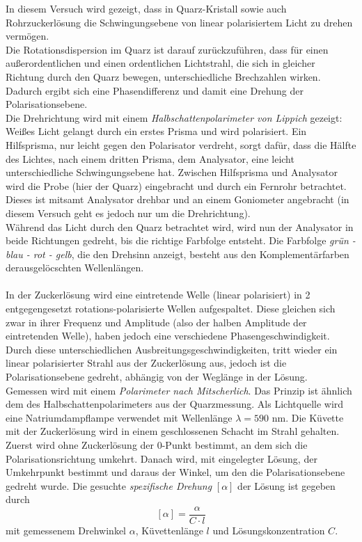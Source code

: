 \documentclass[12pt,a4paper]{article}
\begin{document}
\begin{multicols}{2}
In diesem Versuch wird gezeigt, dass in Quarz-Kristall sowie auch Rohrzuckerlösung die Schwingungsebene von linear polarisiertem Licht zu drehen vermögen.\\
Die Rotationsdispersion im Quarz ist darauf zurückzuführen, dass für einen außerordentlichen und einen ordentlichen Lichtstrahl, die sich in gleicher Richtung durch den Quarz bewegen, unterschiedliche Brechzahlen wirken. Dadurch ergibt sich eine Phasendifferenz und damit eine Drehung der Polarisationsebene.\\
Die Drehrichtung wird mit einem \emph{Halbschattenpolarimeter von Lippich} gezeigt: Weißes Licht gelangt durch ein erstes Prisma und wird polarisiert. Ein Hilfsprisma, nur leicht gegen den Polarisator verdreht, sorgt dafür, dass die Hälfte des Lichtes, nach einem dritten Prisma, dem Analysator, eine leicht unterschiedliche Schwingungsebene hat. Zwischen Hilfsprisma und Analysator wird die Probe (hier der Quarz) eingebracht und durch ein Fernrohr betrachtet. Dieses ist mitsamt Analysator drehbar und an einem Goniometer angebracht (in diesem Versuch geht es jedoch nur um die Drehrichtung).\\
Während das Licht durch den Quarz betrachtet wird, wird nun der Analysator in beide Richtungen gedreht, bis die richtige Farbfolge entsteht. Die Farbfolge \emph{grün - blau - rot - gelb}, die den Drehsinn anzeigt, besteht aus den Komplementärfarben derausgelöcschten Wellenlängen.\\
\\


In der Zuckerlösung wird eine eintretende Welle (linear polarisiert) in 2 entgegengesetzt rotations-polarisierte Wellen aufgespaltet. Diese gleichen sich zwar in ihrer Frequenz und Amplitude (also der halben Amplitude der eintretenden Welle), haben jedoch eine verschiedene Phasengeschwindigkeit.\\
Durch diese unterschiedlichen Ausbreitungsgeschwindigkeiten, tritt wieder ein linear polarisierter Strahl aus der Zuckerlösung aus, jedoch ist die Polarisationsebene gedreht, abhängig von der Weglänge in der Lösung.\\
Gemessen wird mit einem \emph{Polarimeter nach Mitscherlich}. Das Prinzip ist ähnlich dem des Halbschattenpolarimeters aus der Quarzmessung. Als Lichtquelle wird eine Natriumdampflampe verwendet mit Wellenlänge $\lambda = 590$ nm. Die Küvette mit der Zuckerlösung wird in einem geschlossenen Schacht im Strahl gehalten.\\
Zuerst wird ohne Zuckerlösung der 0-Punkt bestimmt, an dem sich die Polarisationsrichtung umkehrt. Danach wird, mit eingelegter Lösung, der Umkehrpunkt bestimmt und daraus der Winkel, um den die Polarisationsebene gedreht wurde.
Die gesuchte \emph{spezifische Drehung} $[\alpha]$ der Lösung ist gegeben durch
$$[\alpha] = \frac{\alpha}{C \cdot l}$$
mit gemessenem Drehwinkel $\alpha$, Küvettenlänge $l$ und Lösungskonzentration $C$.




\end{multicols}
\end{document}
